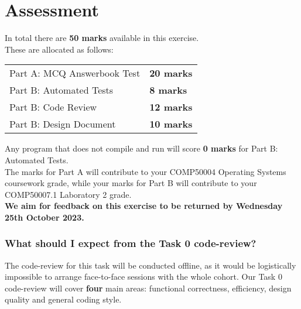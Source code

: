 \documentclass[a4paper,11pt]{article}
\begin{document}
\section*{Assessment}
In total there are {\bf 50 marks} available in this exercise.\\
These are allocated as follows:
%
\begin{center}
\begin{tabular}{l@{\qquad\qquad}l}
  Part A: MCQ Answerbook Test & {\bf 20 marks} \\
  Part B: Automated Tests     & {\bf 8 marks} \\
  Part B: Code Review         & {\bf 12 marks} \\
  Part B: Design Document     & {\bf 10 marks} \\
\end{tabular}
\end{center}
%
Any program that does not compile and run will score {\bf 0 marks} for Part B: Automated Tests.\\[-0.8em]

\noindent The marks for Part A will contribute to your COMP50004 Operating Systems coursework grade,
while your marks for Part B will contribute to your COMP50007.1 Laboratory 2 grade.\\

\noindent \textbf{We aim for feedback on this exercise to be returned by Wednesday 25th October 2023.}

\subsubsection*{What should I expect from the Task 0 code-review?}

The code-review for this task will be conducted offline, as it would be logistically
impossible to arrange face-to-face sessions with the whole cohort.
Our Task 0 code-review will cover \textbf{four} main areas: 
functional correctness, efficiency, design quality and general coding style.
\end{document}
